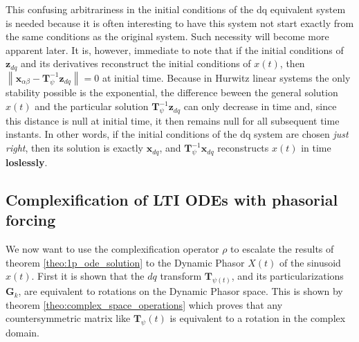 	This confusing arbitrariness in the initial conditions of the dq equivalent system is needed because it is often interesting to have this system not start exactly from the same conditions as the original system. Such necessity will become more apparent later. It is, however, immediate to note that if the initial conditions of $\mathbf{z}_{dq}$ and its derivatives reconstruct the initial conditions of $x(t)$, then  $\left\lVert \mathbf{x}_{\alpha\beta} - \mathbf{T}^{-1}_\psi\mathbf{z}_{dq}\right\rVert  = 0$ at initial time. Because in Hurwitz linear systems the only stability possible is the exponential, the difference beween the general solution $x(t)$ and the particular solution $\mathbf{T}^{-1}_\psi\mathbf{z}_{dq}$ can only decrease in time and, since this distance is null at initial time, it then remains null for all subsequent time instants. In other words, if the initial conditions of the dq system are chosen \textit{just right}, then its solution is exactly $\mathbf{x}_{dq}$, and $\mathbf{T}^{-1}_\psi\mathbf{x}_{dq}$ reconstructs $x(t)$ in time \textbf{loslessly}.

\subsection{Complexification of LTI ODEs with phasorial forcing}\label{subsec:complexification} %
	
	We now want to use the complexification operator $\rho$ to escalate the results of theorem \ref{theo:1p_ode_solution} to the Dynamic Phasor $X(t)$ of the sinusoid $x(t)$. First it is shown that the $dq$ transform $\mathbf{T}_{\psi(t)}$, and its particularizations $\mathbf{G}_k$, are equivalent to rotations on the Dynamic Phasor space. This is shown by theorem \ref{theo:complex_space_operations} which proves that any countersymmetric matrix like $\mathbf{T}_\psi(t)$ is equivalent to a rotation in the complex domain.

